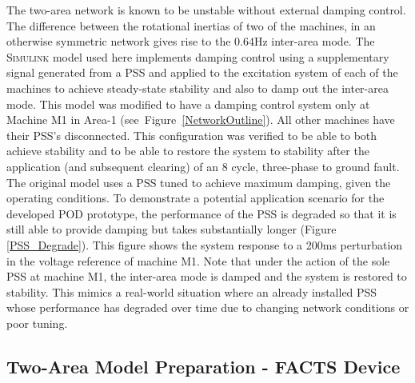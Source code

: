 \documentclass[journal]{IEEEtran}
\begin{document}
The two-area network \cite{KundurTwoArea} is known to be unstable without external damping control. The difference between the rotational inertias of two of the machines, in an otherwise symmetric network gives rise to the 0.64Hz inter-area mode. The \textsc{Simulink} model used here implements damping control using a supplementary signal generated from a PSS and applied to the excitation system of each of the machines to achieve steady-state stability and also to damp out the inter-area mode. This model was modified to have a damping control system only at Machine M1 in Area-1 (see~Figure~\ref{NetworkOutline}). All other machines have their PSS's disconnected. This configuration was  verified to be able to both achieve stability and to be able to restore the system to stability after the application (and subsequent clearing) of an 8 cycle, three-phase to ground fault. The original model uses a PSS tuned to achieve maximum damping, given the operating conditions. To demonstrate a potential application scenario for the developed POD prototype, the performance of the PSS is degraded so that it is still able to provide damping but takes substantially longer (Figure \ref{PSS_Degrade}). This figure shows the system response to a 200ms perturbation in the voltage reference of machine M1. Note that under the action of the sole PSS at machine M1, the inter-area mode is damped and the system is restored to stability. This mimics a real-world situation where an already installed PSS whose performance has degraded over time due to changing network conditions or poor tuning.\\



\subsection{Two-Area Model Preparation - FACTS Device}
\end{document}
